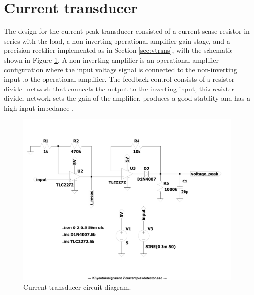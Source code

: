 \section{Current transducer}\label{sec:itrans}
The design for the current peak transducer consisted of a current sense resistor in series with the load, a non inverting operational amplifier gain stage, and a precision rectifier implemented as in Section \ref{sec:vtrans}, with the schematic shown in Figure \ref{fig:itrans_circuit_diagram}. A non inverting amplifier is an operational amplifier configuration where the input voltage signal is connected to the non-inverting input to the operational amplifier. The feedback control consists of a resistor divider network that connects the output to the inverting input, this resistor divider network sets the gain of the amplifier, produces a good stability and has a high input impedance \cite{NonInvertingOpAmp}.
\begin{figure}
    \centering
        \includegraphics[width=0.5\linewidth]{./Figures/itrans_circuit_diagram.pdf}
		    \caption{Current transducer circuit diagram.} \label{fig:itrans_circuit_diagram}
\end{figure}

